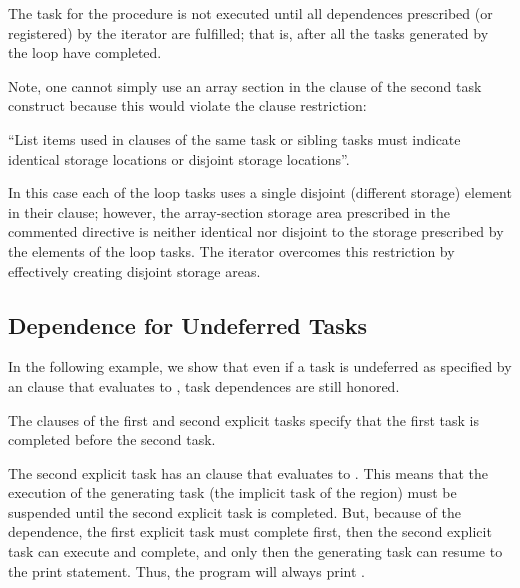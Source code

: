 The task for the  procedure is not executed until all dependences
prescribed (or registered) by the iterator are fulfilled; that is,
after all the tasks generated by the loop have completed.

Note, one cannot simply use an array section in the  clause
of the second task construct because this would violate the  clause restriction:

``List items used in  clauses of the same task or sibling tasks
must indicate identical storage locations or disjoint storage locations''.

In this case each of the loop tasks uses a single disjoint (different storage)
element in their  clause; however,
the array-section storage area prescribed in the commented directive is neither
identical nor disjoint to the storage prescribed by the elements of the
loop tasks.  The iterator overcomes this restriction by effectively
creating  disjoint storage areas.



\subsection{Dependence for Undeferred Tasks}
\label{subsec:depend_undefer_task}

In the following example, we show that even if a task is undeferred as specified
by an  clause that evaluates to , task dependences are
still honored.

The  clauses of the first and second explicit tasks specify that
the first task is completed before the second task.

The second explicit task has an  clause that evaluates to .
This means that the execution of the generating task (the implicit task of
the  region) must be suspended until the second explicit task
is completed.
But, because of the dependence, the first explicit task must complete first,
then the second explicit task can execute and complete, and only then 
the generating task can resume to the print statement.
Thus, the program will always print .

\clearpage




